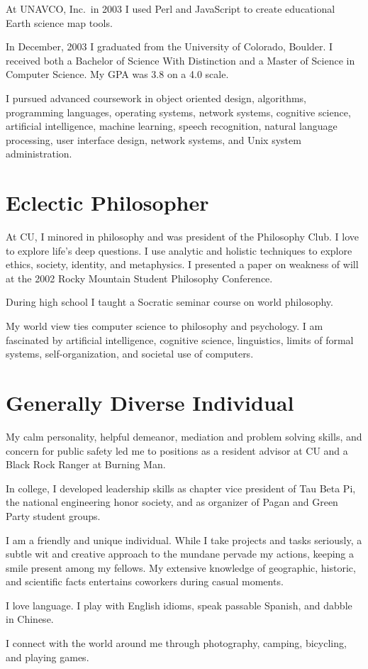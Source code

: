 \begin{compactitem}
    \item 
    At UNAVCO, Inc.~in 2003 I used Perl and JavaScript to create
educational Earth science map tools.
    \item 
    In December, 2003 I graduated from the University of Colorado, Boulder.  I
received both a Bachelor of Science With Distinction and a Master of Science in
Computer Science.  My GPA was 3.8 on a 4.0 scale.
    \item 
    I pursued advanced coursework in object oriented design, algorithms,
programming languages, operating systems, network systems, cognitive science,
artificial intelligence, machine learning, speech recognition, natural language
processing, user interface design, network systems, and Unix system administration.
  \end{compactitem}
\section*{Eclectic Philosopher}
  \begin{compactitem}
    \item At CU, I minored in philosophy and was president of the Philosophy Club.
I love to explore life's deep questions.  I use analytic and holistic techniques
to explore ethics, society, identity, and metaphysics.  I presented a paper on
weakness of will at the 2002 Rocky Mountain Student Philosophy Conference.
    \item During high school I taught a Socratic seminar course on world philosophy.
    \item My world view ties computer science to philosophy and psychology.  I am
fascinated by artificial intelligence, cognitive science, linguistics, limits of
formal systems, self-organization, and societal use of computers.
  \end{compactitem}
\section*{Generally Diverse Individual}
  \begin{compactitem}
    \item My calm personality, helpful demeanor, mediation and problem solving
skills, and concern for public safety led me to positions as a resident advisor
at CU and a Black Rock Ranger at Burning Man.
    \item In college, I developed leadership skills as chapter vice president of
Tau Beta Pi, the national engineering honor society, and as organizer of Pagan
and Green Party student groups.
    \item I am a friendly and unique individual.  While I take projects and tasks
seriously, a subtle wit and creative approach to the mundane pervade my actions,
keeping a smile present among my fellows. My extensive knowledge of geographic,
historic, and scientific facts entertains coworkers during casual moments.
    \item I love language.  I play with English idioms, speak passable
Spanish, and dabble in Chinese.
    \item I connect with the world around me through photography, camping, 
bicycling, and playing games.
  \end{compactitem}
